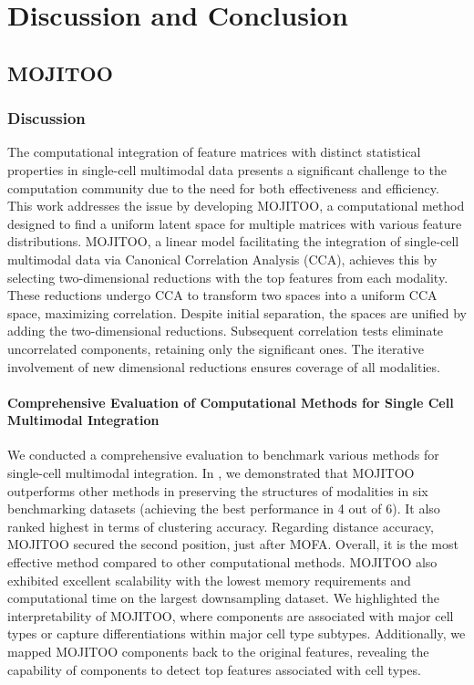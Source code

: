 \chapter{Discussion and Conclusion}
\label{chapter:discussion}

\section{MOJITOO}
\subsection{Discussion}
The computational integration of feature matrices with distinct statistical properties in single-cell multimodal data presents a significant challenge to the computation community due to the need for both effectiveness and efficiency. This work addresses the issue by developing MOJITOO, a computational method designed to find a uniform latent space for multiple matrices with various feature distributions. MOJITOO, a linear model facilitating the integration of single-cell multimodal data via Canonical Correlation Analysis (CCA), achieves this by selecting two-dimensional reductions with the top features from each modality. These reductions undergo CCA to transform two spaces into a uniform CCA space, maximizing correlation. Despite initial separation, the spaces are unified by adding the two-dimensional reductions. Subsequent correlation tests eliminate uncorrelated components, retaining only the significant ones. The iterative involvement of new dimensional reductions ensures coverage of all modalities.

\subsubsection{Comprehensive Evaluation of Computational Methods for Single Cell Multimodal Integration}
We conducted a comprehensive evaluation to benchmark various methods for single-cell multimodal integration. In , we demonstrated that MOJITOO outperforms other methods in preserving the structures of modalities in six benchmarking datasets (achieving the best performance in 4 out of 6). It also ranked highest in terms of clustering accuracy. Regarding distance accuracy, MOJITOO secured the second position, just after MOFA. Overall, it is the most effective method compared to other computational methods\citep{argelaguet2020mofa+,singh2021schema,kriebel2021nonnegative, kang2021symphony,jin2020scai,hao2021seurat4}. MOJITOO also exhibited excellent scalability with the lowest memory requirements and computational time on the largest downsampling dataset. We highlighted the interpretability of MOJITOO, where components are associated with major cell types or capture differentiations within major cell type subtypes. Additionally, we mapped MOJITOO components back to the original features, revealing the capability of components to detect top features associated with cell types.



